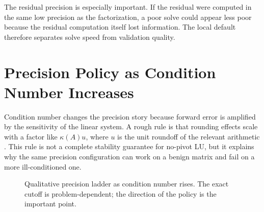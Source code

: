 \documentclass[11pt]{article}
\begin{document}
The residual precision is especially important. If the residual were computed
in the same low precision as the factorization, a poor solve could appear less
poor because the residual computation itself lost information. The local
default therefore separates solve speed from validation quality.

\section{Precision Policy as Condition Number Increases}

Condition number changes the precision story because forward error is
amplified by the sensitivity of the linear system. A rough rule is that
rounding effects scale with a factor like \(\kappa(A)u\), where \(u\) is the
unit roundoff of the relevant arithmetic \cite{higham-accuracy}. This rule is
not a complete stability guarantee for no-pivot LU, but it explains why the
same precision configuration can work on a benign matrix and fail on a more
ill-conditioned one.

\begin{figure}[htbp]
\centering
{}
\caption{Qualitative precision ladder as condition number rises. The exact cutoff is problem-dependent; the direction of the policy is the important point.}
\label{fig:condition-ladder}
\end{figure}
\end{document}
